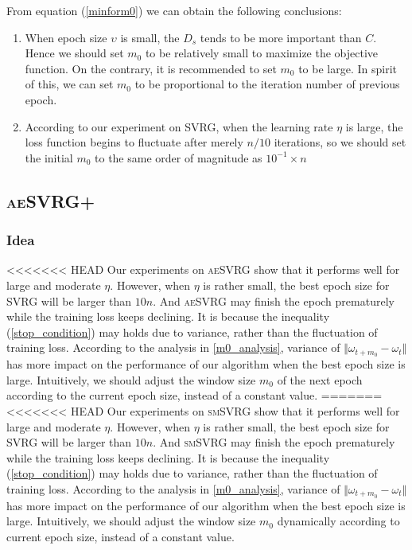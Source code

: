 \documentclass[conference]{IEEEtran}
\begin{document}
\begin{algorithm}[t]
From equation (\ref{minform0}) we can obtain the following conclusions:
\begin{enumerate}
\item When epoch size $\upsilon$ is small, the $D_s$ tends to be more important than $C$. Hence we should set $m_0$ to be relatively small to maximize the objective function. On the contrary, it is recommended to set $m_0$ to be large. In spirit of this, we can set $m_0$ to be proportional to the iteration number of previous epoch.
\item According to our experiment on SVRG, when the learning rate $\eta$ is large, the loss function begins to fluctuate after merely $n/10$ iterations, so we should set the initial $m_0$ to the same order of magnitude as $10^{-1} \times n$
 \end{enumerate}
 
 \subsection{\textsc{aeSVRG+}}
 \subsubsection{Idea}
<<<<<<< HEAD
 Our experiments on \textsc{aeSVRG} show that it performs well for large and moderate $\eta$. However, when $\eta$ is rather small, the best epoch size for SVRG will be larger than $10n$. And \textsc{aeSVRG} may finish the epoch prematurely while the training loss keeps declining. It is because the inequality (\ref{stop_condition}) may holds due to variance, rather than the fluctuation of training loss. According to the analysis in \ref{m0_analysis}, variance of $\Vert\omega_{t+m_0}-\omega_t\Vert$ has more impact on the performance of our algorithm when the best epoch size is large. Intuitively, we should adjust the window size $m_0$ of the next epoch according to the current epoch size, instead of a constant value.
=======
<<<<<<< HEAD
 Our experiments on \textsc{smSVRG} show that it performs well for large and moderate $\eta$. However, when $\eta$ is rather small, the best epoch size for SVRG will be larger than $10n$. And \textsc{smSVRG} may finish the epoch prematurely while the training loss keeps declining. It is because the inequality (\ref{stop_condition}) may holds due to variance, rather than the fluctuation of training loss. According to the analysis in \ref{m0_analysis}, variance of $\Vert\omega_{t+m_0}-\omega_t\Vert$ has more impact on the performance of our algorithm when the best epoch size is large. Intuitively, we should adjust the window size $m_0$ dynamically according to current epoch size, instead of a constant value.

\end{algorithm}
\end{document}
